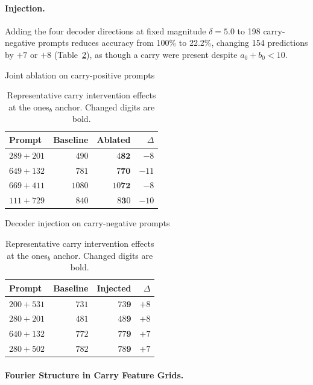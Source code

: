 \paragraph{Injection.}
Adding the four decoder directions at fixed magnitude \(\delta=5.0\) to 198
carry-negative prompts reduces accuracy from 100\% to 22.2\%, changing 154
predictions by \(+7\) or \(+8\) (Table~\ref{tab:carry_intervention}), as though
a carry were present despite \(a_0+b_0<10\).

\begin{table}[ht!]
\centering
\caption{Representative carry intervention effects at the ones$_b$ anchor.
Changed digits are bold.}
\label{tab:carry_intervention}
\begin{minipage}[t]{0.47\textwidth}
  \centering
  \small
  Joint ablation on carry-positive prompts\\[4pt]
  \begin{tabular}{@{}l r r r@{}}
  \toprule
  Prompt & Baseline & Ablated & $\Delta$ \\
  \midrule
  $289{+}201$ & $490$ & $4\mathbf{8}\mathbf{2}$ & $-8$ \\
  $649{+}132$ & $781$ & $7\mathbf{7}\mathbf{0}$ & $-11$ \\
  $669{+}411$ & $1080$ & $10\mathbf{7}\mathbf{2}$ & $-8$ \\
  $111{+}729$ & $840$ & $8\mathbf{3}0$ & $-10$ \\
  \bottomrule
  \end{tabular}
\end{minipage}
\hfill
\begin{minipage}[t]{0.47\textwidth}
  \centering
  \small
  Decoder injection on carry-negative prompts\\[4pt]
  \begin{tabular}{@{}l r r r@{}}
  \toprule
  Prompt & Baseline & Injected & $\Delta$ \\
  \midrule
  $200{+}531$ & $731$ & $73\mathbf{9}$ & $+8$ \\
  $280{+}201$ & $481$ & $48\mathbf{9}$ & $+8$ \\
  $640{+}132$ & $772$ & $77\mathbf{9}$ & $+7$ \\
  $280{+}502$ & $782$ & $78\mathbf{9}$ & $+7$ \\
  \bottomrule
  \end{tabular}
\end{minipage}
\end{table}

\paragraph{Fourier Structure in Carry Feature Grids.}
\label{sec:fourier_patterns}

